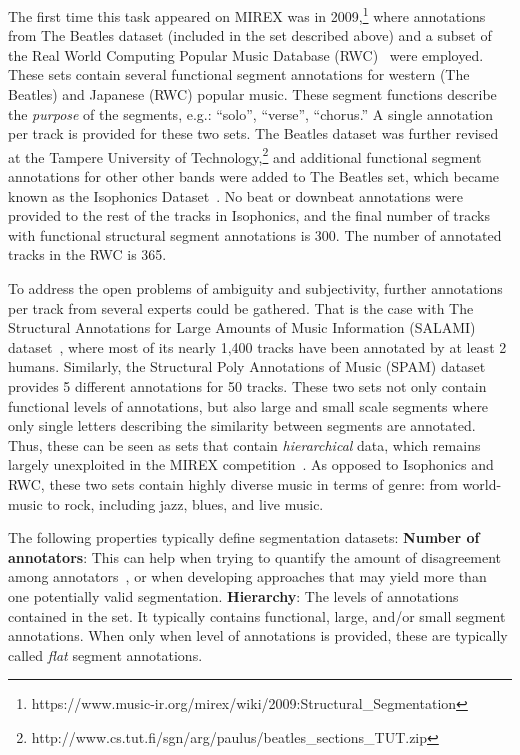 \documentclass{article}
\begin{document}
The first time this task appeared on MIREX was in 2009,\footnote{https://www.music-ir.org/mirex/wiki/2009:Structural\_Segmentation} where annotations from The Beatles dataset (included in the set described above) and a subset of the Real World Computing Popular Music Database (RWC)~\cite{Goto2002} were employed.
These sets contain several functional segment annotations for western (The Beatles) and Japanese (RWC) popular music.
These segment functions describe the \emph{purpose} of the segments, e.g.: ``solo'', ``verse'', ``chorus.''
A single annotation per track is provided for these two sets.
The Beatles dataset was further revised at the Tampere University of Technology,\footnote{http://www.cs.tut.fi/sgn/arg/paulus/beatles\_sections\_TUT.zip} and additional functional segment annotations for other other bands were added to The Beatles set, which became known as the Isophonics Dataset~\cite{Mauch2009a}.
No beat or downbeat annotations were provided to the rest of the tracks in Isophonics, and the final number of tracks with functional structural segment annotations is 300.
The number of annotated tracks in the RWC is 365.

To address the open problems of ambiguity and subjectivity, further annotations per track from several experts could be gathered.
That is the case with The Structural Annotations for Large Amounts of Music Information (SALAMI) dataset~\cite{Smith2011}, where most of its nearly 1,400 tracks have been annotated by at least 2 humans.
Similarly, the Structural Poly Annotations of Music (SPAM) dataset~\cite{Nieto2016} provides 5 different annotations for 50 tracks.
These two sets not only contain functional levels of annotations, but also large and small scale segments where only single letters describing the similarity between segments are annotated.
Thus, these can be seen as sets that contain \emph{hierarchical} data, which remains largely unexploited in the MIREX competition~\cite{Ehmann2011, Smith2013}.
As opposed to Isophonics and RWC, these two sets contain highly diverse music in terms of genre: from world-music to rock, including jazz, blues, and live music.

The following properties typically define segmentation datasets:
\textbf{Number of annotators}: This can help when trying to quantify the amount of disagreement among annotators~\cite{McFee2017,Nieto2016}, or when developing approaches that may yield more than one potentially valid segmentation.
\textbf{Hierarchy}: The levels of annotations contained in the set. It typically contains functional, large, and/or small segment annotations.
When only when level of annotations is provided, these are typically called \emph{flat} segment annotations.
\end{document}

